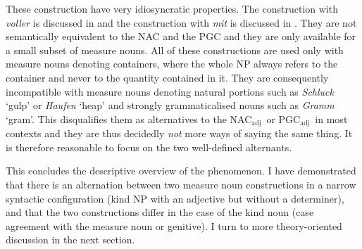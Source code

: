 \documentclass[USenglish]{article}
\newcommand{\Sub}[1]{\ensuremath{\mathrm{_{#1}}}}
\newcommand{\NACa}{NAC\Sub{adj}}
\newcommand{\PGCa}{PGC\Sub{adj}}
\begin{document}
\begin{exe}
  \ex\label{ex:alternatives}
  \begin{xlist}
  \end{xlist}
\end{exe}

These construction have very idiosyncratic properties.
The construction with \textit{voller} is discussed in \cite{Zeldes2018} and the construction with \textit{mit} is discussed in \cite{Bhatt1990}.
They are not semantically equivalent to the NAC and the PGC and they are only available for a small subset of measure nouns.
All of these constructions are used only with measure nouns denoting containers, where the whole NP always refers to the container and never to the quantity contained in it.
They are consequently incompatible with measure nouns denoting natural portions such as \textit{Schluck} `gulp' or \textit{Haufen} `heap' and strongly grammaticalised nouns such as \textit{Gramm} `gram'.
This disqualifies them as alternatives to the \NACa\ or \PGCa\ in most contexts and they are thus decidedly \textit{not} more ways of saying the same thing. 
It is therefore reasonable to focus on the two well-defined alternants.

This concludes the descriptive overview of the phenomenon.
I have demonstrated that there is an alternation between two measure noun constructions in a narrow syntactic configuration (kind NP with an adjective but without a determiner), and that the two constructions differ in the case of the kind noun (case agreement with the measure noun or genitive).
I turn to more theory-oriented discussion in the next section.


\end{document}
